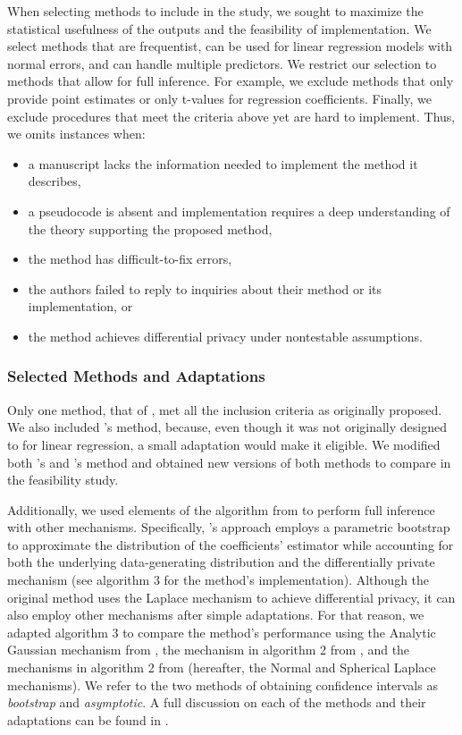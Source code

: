 When selecting methods to include in the study, we sought to maximize the statistical usefulness of the outputs and the feasibility of implementation. We select methods that are frequentist, can be used for linear regression models with normal errors, and can handle multiple predictors. We restrict our selection to methods that allow for full inference. For example, we exclude methods that only provide point estimates or only t-values for regression coefficients. Finally, we exclude procedures that meet the criteria above yet are hard to implement. Thus, we omits instances when: 
\begin{itemize}
    \item a manuscript lacks the information needed to implement the method it describes,
    \item a pseudocode is absent and implementation requires a deep understanding of the theory supporting the proposed method,
    \item the method has difficult-to-fix errors,
    \item the authors failed to reply to inquiries about their method or its implementation, or
    \item the method achieves differential privacy under nontestable assumptions.
\end{itemize}

\subsubsection{Selected Methods and Adaptations}\label{subsubsec:reg_meth}
Only one method, that of \citet{ferrando2020general}, met all the inclusion criteria as originally proposed. We also included \citet{brawner2018bootstrap}'s method, because, even though it was not originally designed to for linear regression, a small adaptation would make it eligible. We modified both \citet{ferrando2020general}'s and \citet{brawner2018bootstrap}'s method and obtained new versions of both methods to compare in the feasibility study. 

Additionally, we used elements of the algorithm from \citet{ferrando2020general} to perform full inference with other mechanisms. Specifically, \citet{ferrando2020general}'s approach employs a parametric bootstrap to approximate the distribution of the coefficients' estimator while accounting for both the underlying data-generating distribution and the differentially private mechanism (see algorithm 3 for the method's implementation). Although the original method uses the Laplace mechanism to achieve differential privacy, it can also employ other mechanisms after simple adaptations. For that reason, we adapted algorithm 3 to compare the method's performance using the Analytic Gaussian mechanism from \citet{balle2018improving}, the mechanism in algorithm 2 from \citet{sheffet2019old}, and the mechanisms in algorithm 2 from \citet{wang2019differentially} (hereafter, the Normal and Spherical Laplace mechanisms). We refer to the two methods of obtaining confidence intervals as \emph{bootstrap} and \emph{asymptotic}. A full discussion on each of the methods and their adaptations can be found in \citet{barrientos2021}.

